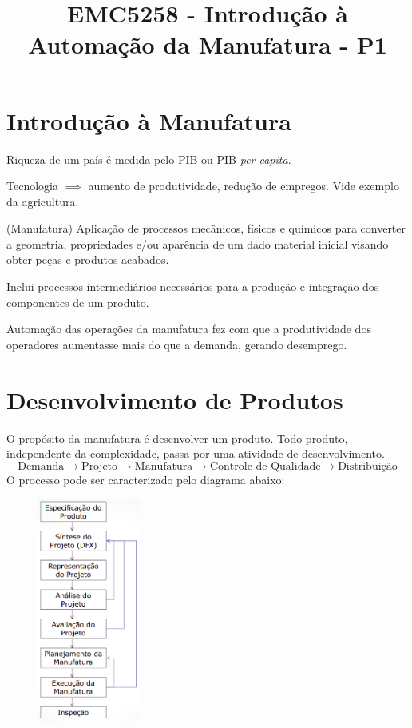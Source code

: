 \documentclass[a4paper]{report}
\title{EMC5258 - Introdução à Automação da Manufatura - P1}
\begin{document}
\section*{Introdução à Manufatura}

Riqueza de um país é medida pelo PIB ou PIB \emph{per capita}.

Tecnologia $\implies$ aumento de produtividade, redução de empregos. Vide exemplo da agricultura.

\begin{definition}
    (Manufatura) Aplicação de processos mecânicos, físicos e químicos para converter a geometria, propriedades e/ou aparência de um dado material inicial visando obter peças e produtos acabados.

    Inclui processos intermediários necessários para a produção e integração dos componentes de um produto.
\end{definition}

Automação das operações da manufatura fez com que a produtividade dos operadores aumentasse mais do que a demanda, gerando desemprego.

\section*{Desenvolvimento de Produtos}

O propósito da manufatura é desenvolver um produto. Todo produto, independente da complexidade, passa por uma atividade de desenvolvimento. \[
\text{Demanda}\to \text{Projeto}\to \text{Manufatura}\to \text{Controle de Qualidade}\to \text{Distribuição}
\] O processo pode ser caracterizado pelo diagrama abaixo:
\begin{figure}[H]
    \centering
    \includegraphics[width=0.3\textwidth]{product_development.png}
\end{figure}
\end{document}

